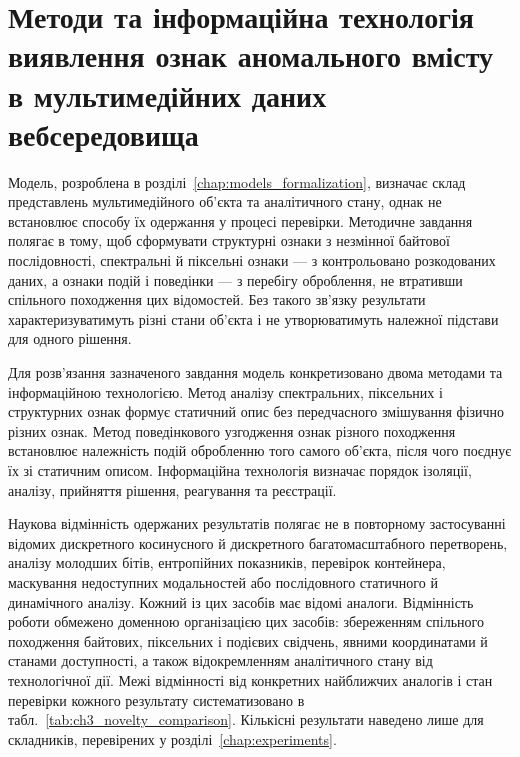\chapter{Методи та інформаційна технологія виявлення ознак аномального вмісту в мультимедійних даних вебсередовища}
\label{chap:methods_technology}

Модель, розроблена в розділі~\ref{chap:models_formalization}, визначає склад представлень мультимедійного об’єкта та аналітичного стану, однак не встановлює способу їх одержання у процесі перевірки. Методичне завдання полягає в тому, щоб сформувати структурні ознаки з незмінної байтової послідовності, спектральні й піксельні ознаки --- з контрольовано розкодованих даних, а ознаки подій і поведінки --- з перебігу оброблення, не втративши спільного походження цих відомостей. Без такого зв’язку результати характеризуватимуть різні стани об’єкта і не утворюватимуть належної підстави для одного рішення.

Для розв’язання зазначеного завдання модель конкретизовано двома методами та інформаційною технологією. Метод аналізу спектральних, піксельних і структурних ознак формує статичний опис без передчасного змішування фізично різних ознак. Метод поведінкового узгодження ознак різного походження встановлює належність подій обробленню того самого об’єкта, після чого поєднує їх зі статичним описом. Інформаційна технологія визначає порядок ізоляції, аналізу, прийняття рішення, реагування та реєстрації.

Наукова відмінність одержаних результатів полягає не в повторному застосуванні відомих дискретного косинусного й дискретного багатомасштабного перетворень, аналізу молодших бітів, ентропійних показників, перевірок контейнера, маскування недоступних модальностей або послідовного статичного й динамічного аналізу. Кожний із цих засобів має відомі аналоги. Відмінність роботи обмежено доменною організацією цих засобів: збереженням спільного походження байтових, піксельних і подієвих свідчень, явними координатами й станами доступності, а також відокремленням аналітичного стану від технологічної дії. Межі відмінності від конкретних найближчих аналогів і стан перевірки кожного результату систематизовано в табл.~\ref{tab:ch3_novelty_comparison}. Кількісні результати наведено лише для складників, перевірених у розділі~\ref{chap:experiments}.

